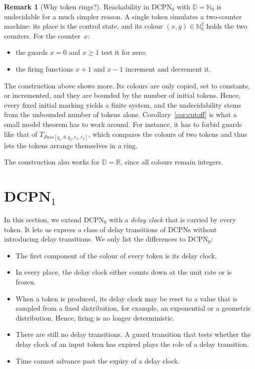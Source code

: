 \documentclass[11pt]{article}
\theoremstyle{definition}
\newcommand{\NatZero}{\mathbb{N}_0}
\newcommand{\Real}{\mathbb{R}}
\newcommand{\Dom}{\mathbb{D}}
\newcommand{\DCPN}[1]{\texorpdfstring{\textup{DCPN}\ensuremath{_{#1}}}{DCPN#1}}
\newtheorem{remark}{Remark}
\begin{document}
\begin{remark}[Why token rings?]\label{rem:why-rings}
  Reachability in \DCPN{0} with $\Dom = \NatZero$ is undecidable for a much
  simpler reason. A single token simulates a two-counter machine: its place
  is the control state, and its colour $(x, y) \in \NatZero^2$ holds the
  two counters. For the counter~$x$:
  \begin{itemize}
    \item the guards $x = 0$ and $x \ge 1$ test it for zero;
    \item the firing functions $x + 1$ and $x - 1$ increment and decrement
      it.
  \end{itemize}
  The construction above shows more. Its colours are only copied, set to
  constants, or incremented, and they are bounded by the number of initial
  tokens. Hence, every fixed initial marking yields a finite system, and the
  undecidability stems from the unbounded number of tokens alone.
  Corollary~\ref{cor:cutoff} is what a small model theorem has to work
  around. For instance, it has to forbid guards like that of
  $T_{\mathit{Pass}[q_1, \theta, q_2, r_1, r_2]}$, which compares the colours
  of two tokens and thus lets the tokens arrange themselves in a ring.

  The construction also works for $\Dom = \Real$, since all colours remain
  integers.
\end{remark}

\section{\DCPN{1}}

In this section, we extend \DCPN{0} with a \emph{delay clock} that is carried
by every token. It lets us express a class of delay transitions of DCPNs
without introducing delay transitions. We only list the differences to
\DCPN{0}:

\begin{itemize}
  \item The first component of the colour of every token is its delay clock.

  \item In every place, the delay clock either counts down at the unit rate
    or is frozen.

  \item When a token is produced, its delay clock may be reset to a value that
    is sampled from a fixed distribution, for example, an exponential or a
    geometric distribution. Hence, firing is no longer deterministic.

  \item There are still no delay transitions. A guard transition that tests
    whether the delay clock of an input token has expired plays the role of a
    delay transition.

  \item Time cannot advance past the expiry of a delay clock.
\end{itemize}
\end{document}
